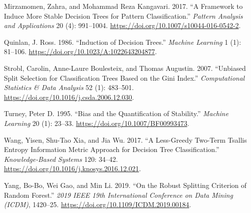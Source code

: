 \documentclass[
  conference]{IEEEtran}
\newlength{\cslhangindent}
\newenvironment{CSLReferences}[2] %
 {\begin{list}{}{%
  \setlength{\itemindent}{0pt}
  \setlength{\leftmargin}{0pt}
  \setlength{\parsep}{0pt}
  \ifodd #1
   \setlength{\leftmargin}{\cslhangindent}
   \setlength{\itemindent}{-1\cslhangindent}
  \fi
  \setlength{\itemsep}{#2\baselineskip}}}
 {\end{list}}
\begin{document}
\begin{CSLReferences}{1}{1}
Mirzamomen, Zahra, and Mohammad Reza Kangavari. 2017. {``A Framework to
Induce More Stable Decision Trees for Pattern Classification.''}
\emph{Pattern Analysis and Applications} 20 (4): 991--1004.
\url{https://doi.org/10.1007/s10044-016-0542-2}.

Quinlan, J. Ross. 1986. {``Induction of Decision Trees.''} \emph{Machine
Learning} 1 (1): 81--106. \url{https://doi.org/10.1023/A:1022643204877}.

Strobl, Carolin, Anne-Laure Boulesteix, and Thomas Augustin. 2007.
{``Unbiased Split Selection for Classification Trees Based on the {G}ini
Index.''} \emph{Computational Statistics \& Data Analysis} 52 (1):
483--501. \url{https://doi.org/10.1016/j.csda.2006.12.030}.

Turney, Peter D. 1995. {``Bias and the Quantification of Stability.''}
\emph{Machine Learning} 20 (1): 23--33.
\url{https://doi.org/10.1007/BF00993473}.

Wang, Yisen, Shu-Tao Xia, and Jia Wu. 2017. {``A Less-Greedy Two-Term
Tsallis Entropy Information Metric Approach for Decision Tree
Classification.''} \emph{Knowledge-Based Systems} 120: 34--42.
\url{https://doi.org/10.1016/j.knosys.2016.12.021}.

Yang, Bo-Bo, Wei Gao, and Min Li. 2019. {``On the Robust Splitting
Criterion of Random Forest.''} \emph{2019 IEEE 19th International
Conference on Data Mining (ICDM)}, 1420--25.
\url{https://doi.org/10.1109/ICDM.2019.00184}.

\end{CSLReferences}
\end{document}
